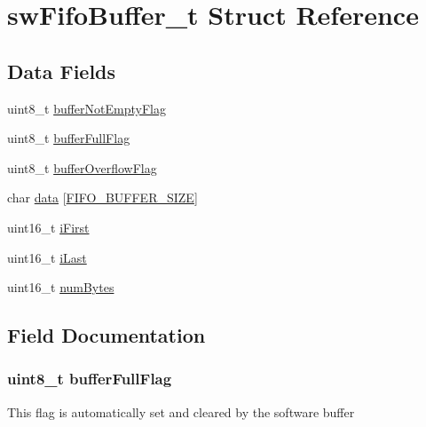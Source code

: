 \hypertarget{structswFifoBuffer__t}{}\section{sw\+Fifo\+Buffer\+\_\+t Struct Reference}
\label{structswFifoBuffer__t}
\subsection*{Data Fields}
\begin{DoxyCompactItemize}
\item 
uint8\+\_\+t \hyperlink{structswFifoBuffer__t_aba90ad8f44ca440bd612c44382c8e144}{buffer\+Not\+Empty\+Flag}
\item 
uint8\+\_\+t \hyperlink{structswFifoBuffer__t_ab14db1b80eab76b7ca4e470a6a9542aa}{buffer\+Full\+Flag}
\item 
uint8\+\_\+t \hyperlink{structswFifoBuffer__t_a7622d9e973da2062ff513cdc76f1d933}{buffer\+Overflow\+Flag}
\item 
char \hyperlink{structswFifoBuffer__t_a1403b7b4337149b3c95e6f17561c621c}{data} \mbox{[}\hyperlink{SwFifoBuffer_8h_ad73fd7fab7940b2765b6a7054fc591dd}{F\+I\+F\+O\+\_\+\+B\+U\+F\+F\+E\+R\+\_\+\+S\+I\+Z\+E}\mbox{]}
\item 
uint16\+\_\+t \hyperlink{structswFifoBuffer__t_aff41afe29075c1ce77eebb0ef1811a15}{i\+First}
\item 
uint16\+\_\+t \hyperlink{structswFifoBuffer__t_ab32da8ee445dbe861a5c5a244c5d3691}{i\+Last}
\item 
uint16\+\_\+t \hyperlink{structswFifoBuffer__t_a625d064298a0c5f99429e3be56b16f18}{num\+Bytes}
\end{DoxyCompactItemize}


\subsection{Field Documentation}
\hypertarget{structswFifoBuffer__t_ab14db1b80eab76b7ca4e470a6a9542aa}{}
\subsubsection[{buffer\+Full\+Flag}]{\setlength{\rightskip}{0pt plus 5cm}uint8\+\_\+t buffer\+Full\+Flag}\label{structswFifoBuffer__t_ab14db1b80eab76b7ca4e470a6a9542aa}
This flag is automatically set and cleared by the software buffer \hypertarget{structswFifoBuffer__t_aba90ad8f44ca440bd612c44382c8e144}{}

